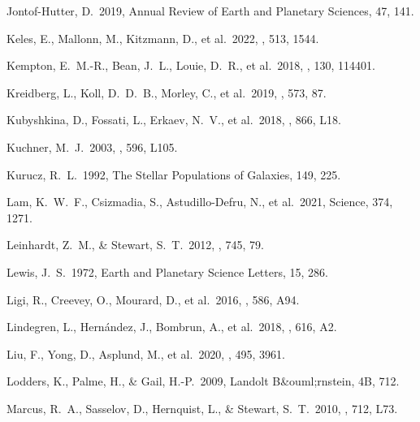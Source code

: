  Jontof-Hutter, D.\ 2019, Annual Review of Earth and Planetary Sciences, 47, 141.

 Keles, E., Mallonn, M., Kitzmann, D., et al.\ 2022, \mnras, 513, 1544.

 Kempton, E.~M.-R., Bean, J.~L., Louie, D.~R., et al.\ 2018, \pasp, 130, 114401.

 Kreidberg, L., Koll, D.~D.~B., Morley, C., et al.\ 2019, \nat, 573, 87.

 Kubyshkina, D., Fossati, L., Erkaev, N.~V., et al.\ 2018, \apjl, 866, L18.

 Kuchner, M.~J.\ 2003, \apjl, 596, L105.

 Kurucz, R.~L.\ 1992, The Stellar Populations of Galaxies, 149, 225.

 Lam, K.~W.~F., Csizmadia, S., Astudillo-Defru, N., et al.\ 2021, Science, 374, 1271.

 Leinhardt, Z.~M., \& Stewart, S.~T.\ 2012, \apj, 745, 79.

 Lewis, J.~S.\ 1972, Earth and Planetary Science Letters, 15, 286.

 Ligi, R., Creevey, O., Mourard, D., et al.\ 2016, \aap, 586, A94.

 Lindegren, L., Hern{\'a}ndez, J., Bombrun, A., et al.\ 2018, \aap, 616, A2.

 Liu, F., Yong, D., Asplund, M., et al.\ 2020, \mnras, 495, 3961.

 Lodders, K., Palme, H., \& Gail, H.-P.\ 2009, Landolt B\&ouml;rnstein, 4B, 712.



 Marcus, R.~A., Sasselov, D., Hernquist, L., \& Stewart, S.~T.\ 2010, \apjl, 712, L73.

